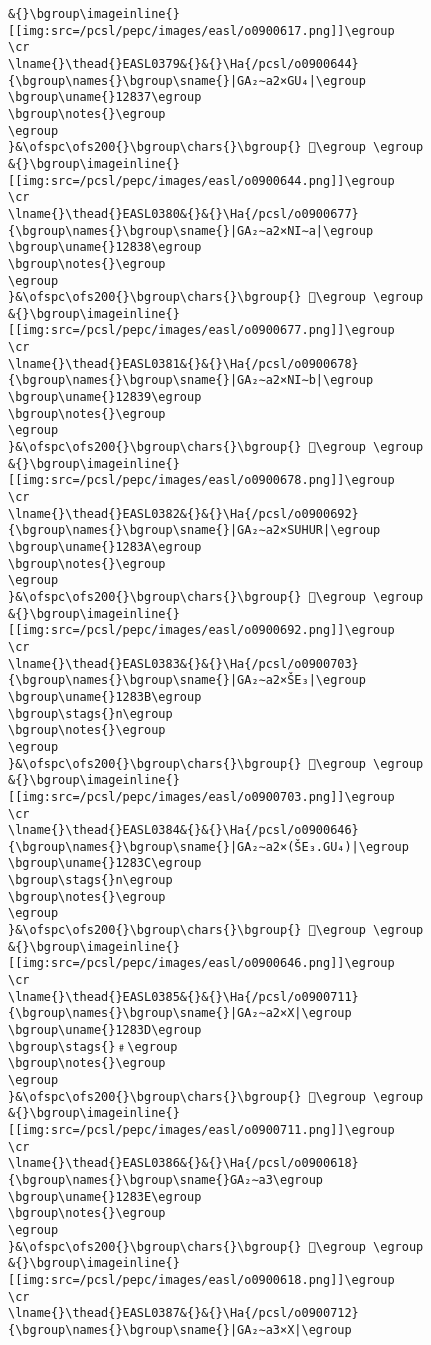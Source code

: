 \begin{verbatim}
&{}\bgroup\imageinline{}[[img:src=/pcsl/pepc/images/easl/o0900617.png]]\egroup
\cr
\lname{}\thead{}EASL0379&{}&{}\Ha{/pcsl/o0900644}{\bgroup\names{}\bgroup\sname{}|GA₂∼a2×GU₄|\egroup
\bgroup\uname{}12837\egroup
\bgroup\notes{}\egroup
\egroup
}&\ofspc\ofs200{}\bgroup\chars{}\bgroup{} 𒠷\egroup \egroup
&{}\bgroup\imageinline{}[[img:src=/pcsl/pepc/images/easl/o0900644.png]]\egroup
\cr
\lname{}\thead{}EASL0380&{}&{}\Ha{/pcsl/o0900677}{\bgroup\names{}\bgroup\sname{}|GA₂∼a2×NI∼a|\egroup
\bgroup\uname{}12838\egroup
\bgroup\notes{}\egroup
\egroup
}&\ofspc\ofs200{}\bgroup\chars{}\bgroup{} 𒠸\egroup \egroup
&{}\bgroup\imageinline{}[[img:src=/pcsl/pepc/images/easl/o0900677.png]]\egroup
\cr
\lname{}\thead{}EASL0381&{}&{}\Ha{/pcsl/o0900678}{\bgroup\names{}\bgroup\sname{}|GA₂∼a2×NI∼b|\egroup
\bgroup\uname{}12839\egroup
\bgroup\notes{}\egroup
\egroup
}&\ofspc\ofs200{}\bgroup\chars{}\bgroup{} 𒠹\egroup \egroup
&{}\bgroup\imageinline{}[[img:src=/pcsl/pepc/images/easl/o0900678.png]]\egroup
\cr
\lname{}\thead{}EASL0382&{}&{}\Ha{/pcsl/o0900692}{\bgroup\names{}\bgroup\sname{}|GA₂∼a2×SUHUR|\egroup
\bgroup\uname{}1283A\egroup
\bgroup\notes{}\egroup
\egroup
}&\ofspc\ofs200{}\bgroup\chars{}\bgroup{} 𒠺\egroup \egroup
&{}\bgroup\imageinline{}[[img:src=/pcsl/pepc/images/easl/o0900692.png]]\egroup
\cr
\lname{}\thead{}EASL0383&{}&{}\Ha{/pcsl/o0900703}{\bgroup\names{}\bgroup\sname{}|GA₂∼a2×ŠE₃|\egroup
\bgroup\uname{}1283B\egroup
\bgroup\stags{}n\egroup
\bgroup\notes{}\egroup
\egroup
}&\ofspc\ofs200{}\bgroup\chars{}\bgroup{} 𒠻\egroup \egroup
&{}\bgroup\imageinline{}[[img:src=/pcsl/pepc/images/easl/o0900703.png]]\egroup
\cr
\lname{}\thead{}EASL0384&{}&{}\Ha{/pcsl/o0900646}{\bgroup\names{}\bgroup\sname{}|GA₂∼a2×(ŠE₃.GU₄)|\egroup
\bgroup\uname{}1283C\egroup
\bgroup\stags{}n\egroup
\bgroup\notes{}\egroup
\egroup
}&\ofspc\ofs200{}\bgroup\chars{}\bgroup{} 𒠼\egroup \egroup
&{}\bgroup\imageinline{}[[img:src=/pcsl/pepc/images/easl/o0900646.png]]\egroup
\cr
\lname{}\thead{}EASL0385&{}&{}\Ha{/pcsl/o0900711}{\bgroup\names{}\bgroup\sname{}|GA₂∼a2×X|\egroup
\bgroup\uname{}1283D\egroup
\bgroup\stags{}﹟\egroup
\bgroup\notes{}\egroup
\egroup
}&\ofspc\ofs200{}\bgroup\chars{}\bgroup{} 𒠽\egroup \egroup
&{}\bgroup\imageinline{}[[img:src=/pcsl/pepc/images/easl/o0900711.png]]\egroup
\cr
\lname{}\thead{}EASL0386&{}&{}\Ha{/pcsl/o0900618}{\bgroup\names{}\bgroup\sname{}GA₂∼a3\egroup
\bgroup\uname{}1283E\egroup
\bgroup\notes{}\egroup
\egroup
}&\ofspc\ofs200{}\bgroup\chars{}\bgroup{} 𒠾\egroup \egroup
&{}\bgroup\imageinline{}[[img:src=/pcsl/pepc/images/easl/o0900618.png]]\egroup
\cr
\lname{}\thead{}EASL0387&{}&{}\Ha{/pcsl/o0900712}{\bgroup\names{}\bgroup\sname{}|GA₂∼a3×X|\egroup

\end{verbatim}
